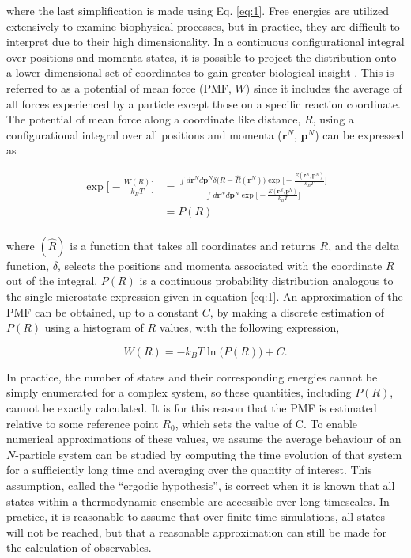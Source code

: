 \begin{refsection}
where the last simplification is made using Eq. \ref{eq:1}. Free energies are utilized extensively to examine biophysical processes, but in practice, they are difficult to interpret due to their high dimensionality. In a continuous configurational integral over positions and momenta states, it is possible to project the distribution onto a lower-dimensional set of coordinates to gain greater biological insight \cite{Zuckerman:2010ue}. This is referred to as a potential of mean force (PMF, $W$) since it includes the average of all forces experienced by a particle except those on a specific reaction coordinate. The potential of mean force along a coordinate like distance, $R$, using a configurational integral over all positions and momenta ($\mathbf{r}^N$, $\mathbf{p}^N$) can be expressed as 

\begin{equation}
\label{eq:2b}
\begin{split}
 \exp \Big[ - \frac{W(R)}{k_B T} \Big] & = \frac{\int d\mathbf{r}^N d\mathbf{p}^N \delta \big( R - \hat{R}(\mathbf{r}^N) \big) \exp \big[ - \frac{E(\mathbf{r}^N, \mathbf{p}^N)}{k_B T} \big]}{\int d\mathbf{r}^N d\mathbf{p}^N \exp \big[ - \frac{E(\mathbf{r}^N, \mathbf{p}^N)}{k_B T} \big]} \\
                                                              & = P(R) \\
 \end{split}
\end{equation}

where $(\hat R)$ is a function that takes all coordinates and returns $R$, and the delta function, $\delta$, selects the positions and momenta associated with the coordinate $R$ out of the integral. $P(R)$ is a continuous probability distribution analogous to the single microstate expression given in equation \ref{eq:1}. An approximation of the PMF can be obtained, up to a constant $C$, by making a discrete estimation of $P(R)$ using a histogram of $R$ values, with the following expression,

\begin{equation}
\label{eq:3}
 W(R) = - k_{B}T \ln \big( P(R) \big) + C.
\end{equation}

In practice, the number of states and their corresponding energies cannot be simply enumerated for a complex system, so these quantities, including $P(R)$, cannot be exactly calculated. It is for this reason that the PMF is estimated relative to some reference point $R_0$, which sets the value of C. To enable numerical approximations of these values, we assume the average behaviour of an $N$-particle system can be studied by computing the time evolution of that system for a sufficiently long time and averaging over the quantity of interest. This assumption, called the ``ergodic hypothesis'', is correct when it is known that all states within a thermodynamic ensemble are accessible over long timescales. In practice, it is reasonable to assume that over finite-time simulations, all states will not be reached, but that a reasonable approximation can still be made for the calculation of observables. 


\end{refsection}
